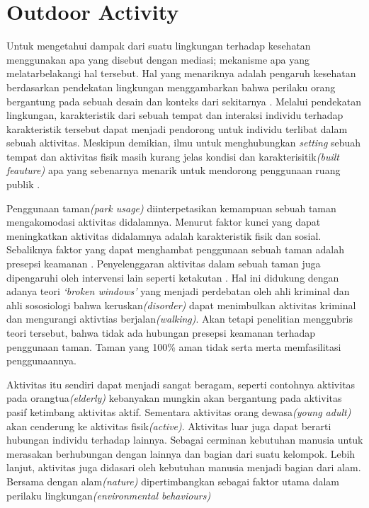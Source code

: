\documentclass[../thesis.tex]{subfiles}
\begin{document}
\section{Outdoor Activity}

Untuk mengetahui dampak dari suatu lingkungan terhadap kesehatan \cite{lachowycz2013towards} menggunakan apa yang disebut dengan mediasi; mekanisme apa yang melatarbelakangi hal tersebut. Hal yang menariknya adalah pengaruh kesehatan berdasarkan pendekatan lingkungan menggambarkan bahwa perilaku orang bergantung pada sebuah desain dan konteks dari sekitarnya \citep{cohen2010parks}. Melalui pendekatan lingkungan, karakteristik dari sebuah tempat dan interaksi individu terhadap karakteristik tersebut dapat menjadi pendorong untuk individu terlibat dalam sebuah aktivitas. Meskipun demikian, ilmu untuk menghubungkan \textit{setting} sebuah tempat dan aktivitas fisik masih kurang jelas kondisi dan karakterisitik\textit{(built feauture)} apa yang sebenarnya menarik untuk mendorong penggunaan ruang publik \citep{rull2005prescription,cohen2010parks}.

Penggunaan taman\textit{(park usage)} diinterpetasikan kemampuan sebuah taman mengakomodasi aktivitas didalamnya. Menurut \cite{cohen2010parks} faktor kunci yang dapat meningkatkan aktivitas didalamnya adalah karakteristik fisik dan sosial. Sebaliknya faktor yang dapat menghambat penggunaan sebuah taman adalah presepsi keamanan \citep{molnar2004unsafe,gomez2004violent,centers1999neighborhood}. Penyelenggaran aktivitas dalam sebuah taman juga dipengaruhi oleh intervensi lain seperti ketakutan \cite{roman2013pathways}.
Hal ini didukung dengan adanya teori \textit{`broken windows'}\citep{kelling1997fixing} yang menjadi perdebatan oleh ahli kriminal dan ahli sososiologi bahwa keruskan\textit{(disorder)} dapat menimbulkan aktivitas kriminal dan mengurangi aktivtias berjalan\textit{(walking)}. Akan tetapi penelitian \citep{cohen2010parks} menggubris teori tersebut, bahwa tidak ada hubungan presepsi keamanan terhadap penggunaan taman. Taman yang 100\% aman tidak serta merta memfasilitasi penggunaannya.

Aktivitas itu sendiri dapat menjadi sangat beragam, seperti contohnya aktivitas pada orangtua\textit{(elderly)} kebanyakan mungkin akan bergantung pada aktivitas pasif ketimbang aktivitas aktif. Sementara aktivitas orang dewasa\textit{(young adult)} akan cenderung ke aktivitas fisik\textit{(active)}. Aktivitas luar juga dapat berarti hubungan individu terhadap lainnya. Sebagai cerminan kebutuhan manusia untuk merasakan berhubungan dengan lainnya dan bagian dari suatu kelompok\citep{junot2017passion}. Lebih lanjut, aktivitas juga didasari oleh kebutuhan manusia menjadi bagian dari alam\citep{junot2017passion,nabhan1993loss}. Bersama dengan alam\textit{(nature)} dipertimbangkan sebagai faktor utama dalam perilaku lingkungan\textit{(environmental behaviours)}\citep{capaldi2014relationship,dutcher2007connectivity,kals1999emotional,mayer2004connectedness}
\end{document}
